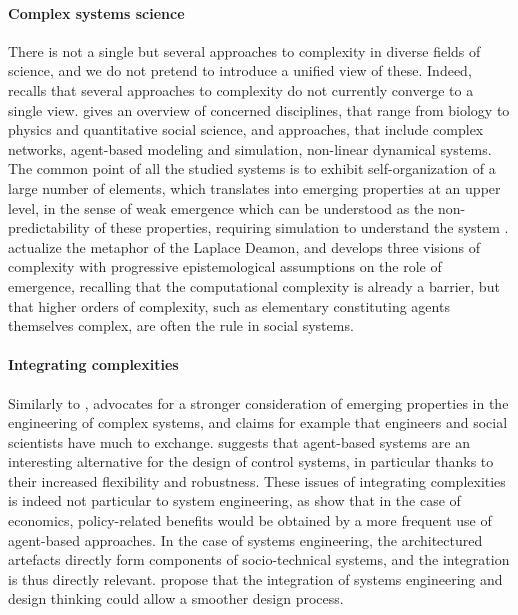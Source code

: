 \documentclass[runningheads,a4paper]{llncs}
\begin{document}
\paragraph{Complex systems science}

There is not a single but several approaches to complexity in diverse fields of science, and we do not pretend to introduce a unified view of these. Indeed, \cite{chu2008criteria} recalls that several approaches to complexity do not currently converge to a single view. \cite{newman2011complex} gives an overview of concerned disciplines, that range from biology to physics and quantitative social science, and approaches, that include complex networks, agent-based modeling and simulation, non-linear dynamical systems. The common point of all the studied systems is to exhibit self-organization of a large number of elements, which translates into emerging properties at an upper level, in the sense of weak emergence which can be understood as the non-predictability of these properties, requiring simulation to understand the system \cite{bedau2002downward}. \cite{deffuant2015visions} actualize the metaphor of the Laplace Deamon, and develops three visions of complexity with progressive epistemological assumptions on the role of emergence, recalling that the computational complexity is already a barrier, but that higher orders of complexity, such as elementary constituting agents themselves complex, are often the rule in social systems.


\paragraph{Integrating complexities}


Similarly to \cite{sheard2009principles}, \cite{ottino2004engineering} advocates for a stronger consideration of emerging properties in the engineering of complex systems, and claims for example that engineers and social scientists have much to exchange. \cite{jennings2003agent} suggests that agent-based systems are an interesting alternative for the design of control systems, in particular thanks to their increased flexibility and robustness. These issues of integrating complexities is indeed not particular to system engineering, as \cite{farmer2009economy} show that in the case of economics, policy-related benefits would be obtained by a more frequent use of agent-based approaches. In the case of systems engineering, the architectured artefacts directly form components of socio-technical systems, and the integration is thus directly relevant. \cite{durantin2017disruptive} propose that the integration of systems engineering and design thinking could allow a smoother design process.
\end{document}
